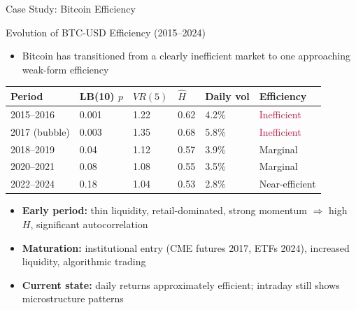 \documentclass[9pt, aspectratio=169, t]{beamer}
\theoremstyle{definition}
\newenvironment{cminipage}[1]{%
    \par\noindent\hfill\begin{minipage}{#1}\ignorespaces
}{%
    \end{minipage}\hfill\null\par
}
\begin{document}
\begin{frame}{Case Study: Bitcoin Efficiency}
\begin{cminipage}{0.95\textwidth}
\small
\begin{block}{Evolution of BTC-USD Efficiency (2015--2024)}
\begin{itemize}\setlength{\itemsep}{0pt}
    \item Bitcoin has transitioned from a clearly inefficient market to one approaching weak-form efficiency
\end{itemize}
\end{block}

\footnotesize
\renewcommand{\arraystretch}{1.1}
\begin{center}
\begin{tabular}{llllll}
\toprule
\textbf{Period} & \textbf{LB(10) $p$} & \textbf{$VR(5)$} & \textbf{$\hat{H}$} & \textbf{Daily vol} & \textbf{Efficiency} \\
\midrule
2015--2016 & 0.001 & 1.22 & 0.62 & 4.2\% & \textcolor{Crimson}{Inefficient} \\
2017 (bubble) & 0.003 & 1.35 & 0.68 & 5.8\% & \textcolor{Crimson}{Inefficient} \\
2018--2019 & 0.04 & 1.12 & 0.57 & 3.9\% & \textcolor{Amber}{Marginal} \\
2020--2021 & 0.08 & 1.08 & 0.55 & 3.5\% & \textcolor{Amber}{Marginal} \\
2022--2024 & 0.18 & 1.04 & 0.53 & 2.8\% & \textcolor{Forest}{Near-efficient} \\
\bottomrule
\end{tabular}
\end{center}

\vspace{0.1cm}
\begin{itemize}\setlength{\itemsep}{0pt}
    \item \textbf{Early period:} thin liquidity, retail-dominated, strong momentum $\Rightarrow$ high $H$, significant autocorrelation
    \item \textbf{Maturation:} institutional entry (CME futures 2017, ETFs 2024), increased liquidity, algorithmic trading
    \item \textbf{Current state:} daily returns approximately efficient; intraday still shows microstructure patterns
\end{itemize}
\end{cminipage}
\end{frame}
\end{document}
